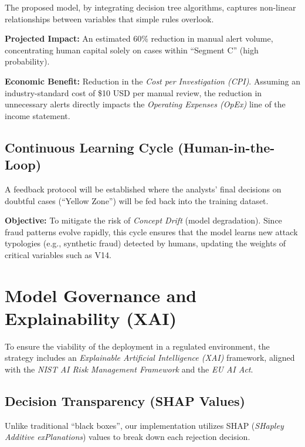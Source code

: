 \documentclass[12pt,a4paper]{report}
\begin{document}
The proposed model, by integrating decision tree algorithms, captures non-linear relationships between variables that simple rules overlook.

\textbf{Projected Impact:} An estimated 60\% reduction in manual alert volume, concentrating human capital solely on cases within \textquotedblleft Segment C\textquotedblright{} (high probability).  

\textbf{Economic Benefit:} Reduction in the \textit{Cost per Investigation (CPI)}. Assuming an industry-standard cost of \$10 USD per manual review, the reduction in unnecessary alerts directly impacts the \textit{Operating Expenses (OpEx)} line of the income statement.

\subsection{Continuous Learning Cycle (Human-in-the-Loop)}

A feedback protocol will be established where the analysts' final decisions on doubtful cases (\textquotedblleft Yellow Zone\textquotedblright) will be fed back into the training dataset.

\textbf{Objective:} To mitigate the risk of \textit{Concept Drift} (model degradation). Since fraud patterns evolve rapidly, this cycle ensures that the model learns new attack typologies (e.g., synthetic fraud) detected by humans, updating the weights of critical variables such as V14.


\section{Model Governance and Explainability (XAI)}

To ensure the viability of the deployment in a regulated environment, the strategy includes an \textit{Explainable Artificial Intelligence (XAI)} framework, aligned with the \textit{NIST AI Risk Management Framework} \cite{nist2023} and the \textit{EU AI Act}.



\subsection{Decision Transparency (SHAP Values)}

Unlike traditional \textquotedblleft black boxes\textquotedblright{}, our implementation utilizes SHAP (\textit{SHapley Additive exPlanations}) values to break down each rejection decision.
\end{document}
